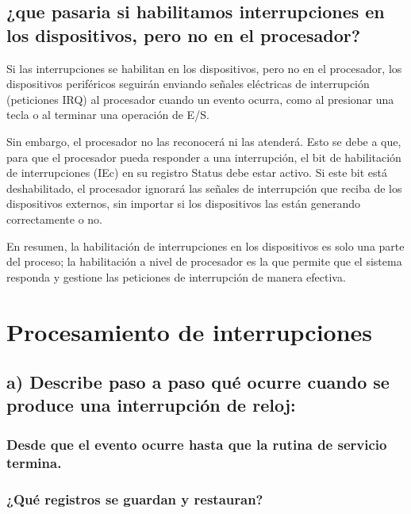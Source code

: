 \documentclass{article}
\begin{document}
{{\subsection{¿que pasaria si habilitamos interrupciones en los dispositivos, pero no en el procesador?}

{Si las interrupciones se habilitan en los dispositivos, pero no en el procesador, los dispositivos periféricos seguirán enviando señales eléctricas de interrupción (peticiones IRQ) al procesador cuando un evento ocurra, como al presionar una tecla o al terminar una operación de E/S.}

\quad

{Sin embargo, el procesador no las reconocerá ni las atenderá. Esto se debe a que, para que el procesador pueda responder a una interrupción, el bit de habilitación de interrupciones (IEc) en su registro Status debe estar activo. Si este bit está deshabilitado, el procesador ignorará las señales de interrupción que reciba de los dispositivos externos, sin importar si los dispositivos las están generando correctamente o no.}

\quad

{En resumen, la habilitación de interrupciones en los dispositivos es solo una parte del proceso; la habilitación a nivel de procesador es la que permite que el sistema responda y gestione las peticiones de interrupción de manera efectiva.}

\quad
\newpage









\section{Procesamiento de interrupciones}

\subsection*{a) Describe paso a paso qué ocurre cuando se produce una interrupción de reloj:}
\subsubsection*{Desde que el evento ocurre hasta que la rutina de servicio termina.}
\subsubsection*{¿Qué registros se guardan y restauran?}
}}
\end{document}

